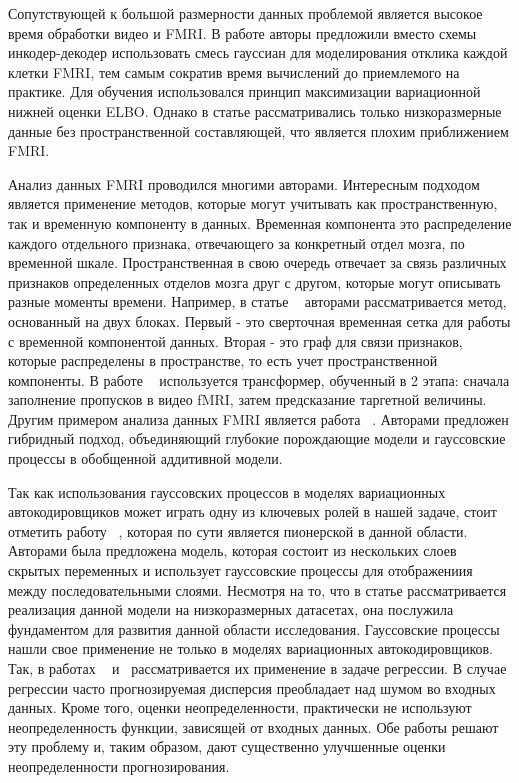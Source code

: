 \documentclass{article}
\begin{document}
Сопутствующей к большой размерности данных  проблемой является высокое время обработки видео и FMRI. В работе \cite{rezaei2021real} авторы предложили вместо схемы инкодер-декодер использовать смесь гауссиан для моделирования отклика каждой клетки FMRI, тем самым сократив время вычислений до приемлемого на практике. Для обучения использовался принцип максимизации вариационной нижней оценки ELBO. Однако в статье рассматривались только низкоразмерные данные без пространственной составляющей, что является плохим приближением FMRI. 

Анализ данных FMRI проводился многими авторами. Интересным подходом является применение методов, которые могут учитывать как пространственную, так и временную компоненту в данных. Временная компонента это распределение каждого отдельного признака, отвечающего за конкретный отдел мозга, по временной шкале. Пространственная в свою очередь отвечает за связь различных признаков определенных отделов мозга друг с другом, которые могут описывать разные моменты времени. Например, в статье ~\cite{azevedo2022deep} авторами рассматривается метод, основанный на двух блоках. Первый - это сверточная временная сетка для работы с временной компонентой данных. Вторая - это граф для связи признаков, которые распределены в пространстве, то есть учет пространственной компоненты.  
В работе ~\cite{malkiel2022selfsupervised} используется трансформер, обученный в 2 этапа: сначала заполнение пропусков в видео fMRI, затем предсказание таргетной величины. 
Другим примером анализа данных FMRI является работа ~\cite{Albuquerque_FMRI}. Авторами предложен гибридный подход, объединяющий глубокие порождающие модели и гауссовские процессы в обобщенной аддитивной модели.

Так как использования гауссовских процессов в моделях вариационных автокодировщиков может играть одну из ключевых ролей в нашей задаче, стоит отметить работу ~\cite{dai2016variational}, которая по сути является пионерской в данной области. Авторами была предложена модель, которая состоит из нескольких слоев скрытых переменных и использует гауссовские процессы для отображениия между последовательными слоями. Несмотря на то, что в статье рассматривается реализация данной модели на низкоразмерных датасетах, она послужила фундаментом для развития данной области исследования. Гауссовские процессы нашли свое применение не только в моделях вариационных автокодировщиков. Так, в работах ~\cite{jankowiak2020parametric} и ~\cite{wang2022intuitive}рассматривается их применение в задаче регрессии. В случае регрессии часто прогнозируемая дисперсия преобладает над шумом во входных данных. Кроме того,  оценки неопределенности,  практически не используют неопределенность функции, зависящей от входных данных. Обе работы решают эту проблему и, таким образом, дают существенно улучшенные оценки неопределенности прогнозирования.
\end{document}
